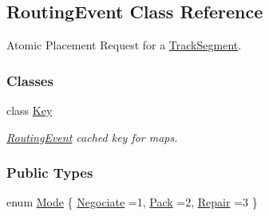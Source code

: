 \hypertarget{classKite_1_1RoutingEvent}{}\subsection{Routing\+Event Class Reference}
\label{classKite_1_1RoutingEvent}


Atomic Placement Request for a \hyperlink{classKite_1_1TrackSegment}{Track\+Segment}.  


\subsubsection*{Classes}
\begin{DoxyCompactItemize}
\item 
class \hyperlink{classKite_1_1RoutingEvent_1_1Key}{Key}
\begin{DoxyCompactList}\small\item\em \hyperlink{classKite_1_1RoutingEvent}{Routing\+Event} cached key for maps. \end{DoxyCompactList}\end{DoxyCompactItemize}
\subsubsection*{Public Types}
\begin{DoxyCompactItemize}
\item 
enum \hyperlink{classKite_1_1RoutingEvent_a46c8a310cf4c094f8c80e1cb8dc1f911}{Mode} \{ \newline
\hyperlink{classKite_1_1RoutingEvent_a46c8a310cf4c094f8c80e1cb8dc1f911a3980b02882c46c9bd4caf15040b85d1a}{Negociate} =1, 
\newline
\hyperlink{classKite_1_1RoutingEvent_a46c8a310cf4c094f8c80e1cb8dc1f911a5afe185b48d7acf013dd5ccadc5b2414}{Pack} =2, 
\newline
\hyperlink{classKite_1_1RoutingEvent_a46c8a310cf4c094f8c80e1cb8dc1f911a27b403019a93f9f127cf64a0688a8288}{Repair} =3
 \}
\end{DoxyCompactItemize}
